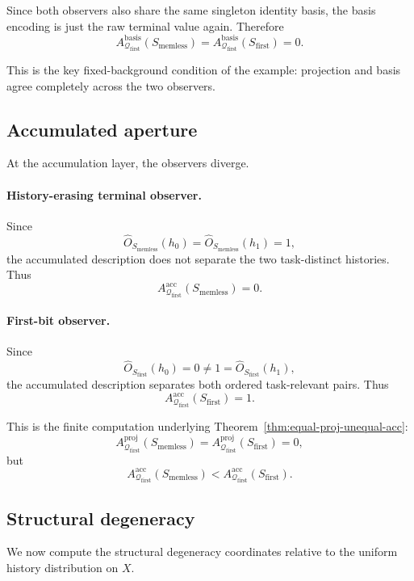 \documentclass[11pt,twoside]{article}
\theoremstyle{definition}
\newcommand{\proj}{\mathrm{proj}}
\newcommand{\basis}{\mathrm{basis}}
\newcommand{\acc}{\mathrm{acc}}
\begin{document}
Since both observers also share the same singleton identity basis, the basis encoding is just the raw terminal value again. Therefore
\[
  A^{\basis}_{\mathcal{Q}_{\mathrm{first}}}(S_{\mathrm{memless}})
  =
  A^{\basis}_{\mathcal{Q}_{\mathrm{first}}}(S_{\mathrm{first}})
  =
  0.
\]

This is the key fixed-background condition of the example: projection and basis agree completely across the two observers.

\subsection{Accumulated aperture}
\label{app:memory-acc-aperture}

At the accumulation layer, the observers diverge.

\paragraph{History-erasing terminal observer.}
Since
\[
  \widehat{O}_{S_{\mathrm{memless}}}(h_0)
  =
  \widehat{O}_{S_{\mathrm{memless}}}(h_1)
  =
  1,
\]
the accumulated description does not separate the two task-distinct histories. Thus
\[
  A^{\acc}_{\mathcal{Q}_{\mathrm{first}}}(S_{\mathrm{memless}})=0.
\]

\paragraph{First-bit observer.}
Since
\[
  \widehat{O}_{S_{\mathrm{first}}}(h_0)=0
  \neq
  1=\widehat{O}_{S_{\mathrm{first}}}(h_1),
\]
the accumulated description separates both ordered task-relevant pairs. Thus
\[
  A^{\acc}_{\mathcal{Q}_{\mathrm{first}}}(S_{\mathrm{first}})=1.
\]

This is the finite computation underlying Theorem~\ref{thm:equal-proj-unequal-acc}:
\[
  A^{\proj}_{\mathcal{Q}_{\mathrm{first}}}(S_{\mathrm{memless}})
  =
  A^{\proj}_{\mathcal{Q}_{\mathrm{first}}}(S_{\mathrm{first}})
  =
  0,
\]
but
\[
  A^{\acc}_{\mathcal{Q}_{\mathrm{first}}}(S_{\mathrm{memless}})
  <
  A^{\acc}_{\mathcal{Q}_{\mathrm{first}}}(S_{\mathrm{first}}).
\]

\subsection{Structural degeneracy}
\label{app:memory-structural-degeneracy}

We now compute the structural degeneracy coordinates relative to the uniform history distribution on \(X\).
\end{document}
